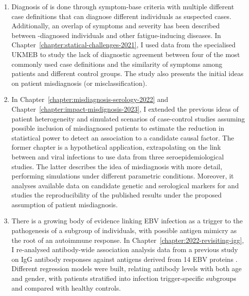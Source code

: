 \begin{enumerate}
    \setlength{\itemsep}{1.5pt}
    \setlength{\parskip}{0pt}
    \setlength{\parsep}{0pt}
    
    \item Diagnosis of \cfs is done through symptom-base criteria with multiple different case definitions that can diagnose different individuals as suspected cases. Additionally, an overlap of symptoms and severity has been described between \cfs-diagnosed individuals and other fatigue-inducing diseases. In Chapter~\ref{chapter:statical-challenges-2021}, I used data from the specialised UKMEB to study the lack of diagnostic agreement between four of the most commonly used \cfs case definitions and the similarity of symptoms among patients and different control groups. The study also presents the initial ideas on patient misdiagnosis (or misclassification).

    \item In Chapter~\ref{chapter:misdiagnosis-serology-2022} and Chapter~\ref{chapter:impact-misdignosis-2023}, I extended the previous ideas of patient heterogeneity and simulated scenarios of case-control studies assuming possible inclusion of misdiagnosed patients to estimate the reduction in statistical power to detect an association to a candidate causal factor. The former chapter is a hypothetical application, extrapolating on the link between \cfs and viral infections to use data from three \covid seroepidemiological studies. The latter describes the idea of misdiagnosis with more detail, performing simulations under different parametric conditions. Moreover, it analyses available data on candidate genetic and serological markers for \cfs and studies the reproducibility of the published results under the proposed assumption of patient misdiagnosis.

    \item There is a growing body of evidence linking EBV infection as a trigger to the pathogenesis of a subgroup of \cfs individuals, with possible antigen mimicry as the root of an autoimmune response. In Chapter~\ref{chapter:2022-revisiting-igg}, I re-analysed antibody-wide association analysis data from a previous study on IgG antibody responses against antigens derived from 14 EBV proteins \citep{loebel2017SerologicalProfiling}. Different regression models were built, relating antibody levels with both age and gender, with \cfs patients stratified into infection trigger-specific subgroups and compared with healthy controls.


\end{enumerate}
